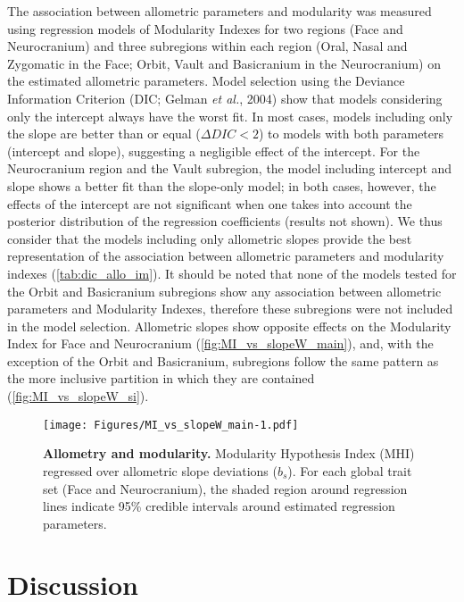 \documentclass[12pt,]{article}
\begin{document}
The association between allometric parameters and modularity was
measured using regression models of Modularity Indexes for two regions
(Face and Neurocranium) and three subregions within each region (Oral,
Nasal and Zygomatic in the Face; Orbit, Vault and Basicranium in the
Neurocranium) on the estimated allometric parameters. Model selection
using the Deviance Information Criterion (DIC; Gelman \emph{et al.},
2004) show that models considering only the intercept always have the
worst fit. In most cases, models including only the slope are better
than or equal ($\Delta DIC < 2$) to models with both parameters
(intercept and slope), suggesting a negligible effect of the intercept.
For the Neurocranium region and the Vault subregion, the model including
intercept and slope shows a better fit than the slope-only model; in
both cases, however, the effects of the intercept are not significant
when one takes into account the posterior distribution of the regression
coefficients (results not shown). We thus consider that the models
including only allometric slopes provide the best representation of the
association between allometric parameters and modularity indexes
(\autoref{tab:dic_allo_im}). It should be noted that none of the models
tested for the Orbit and Basicranium subregions show any association
between allometric parameters and Modularity Indexes, therefore these
subregions were not included in the model selection. Allometric slopes
show opposite effects on the Modularity Index for Face and Neurocranium
(\autoref{fig:MI_vs_slopeW_main}), and, with the exception of the Orbit
and Basicranium, subregions follow the same pattern as the more
inclusive partition in which they are contained
(\autoref{fig:MI_vs_slopeW_si}).

\begin{figure}[htbp]
\centering
\texttt{[image: Figures/MI\_vs\_slopeW\_main-1.pdf]}
\caption{\textbf{Allometry and modularity.} Modularity Hypothesis Index
(MHI) regressed over allometric slope deviations ($b_s$). For each
global trait set (Face and Neurocranium), the shaded region around
regression lines indicate 95\% credible intervals around estimated
regression parameters. \label{fig:MI_vs_slopeW_main}}
\end{figure}

\section{Discussion}\label{discussion}
\end{document}
